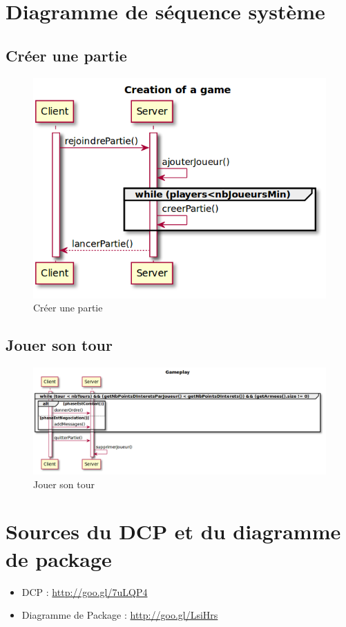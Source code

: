 \section{Diagramme de séquence système}
	\subsection{Créer une partie}
		\vspace{10mm}
		\begin{figure}[!h]
			\centering
			\includegraphics[scale=0.5]{images/DSSCreate.png}
			\caption{Créer une partie}
		\end{figure}


	\subsection{Jouer son tour}
		\vspace{10mm}
		\begin{figure}[!h]
			\centering
			\includegraphics[scale=0.3]{images/DSSGameplay.png}
			\caption{Jouer son tour}
		\end{figure}
		\vspace{70mm}

\section{Sources du DCP et du diagramme de package}
	\begin{itemize}
		\item DCP : \url{http://goo.gl/7uLQP4}
		\item Diagramme de Package : \url{http://goo.gl/LsiHrs}
	\end{itemize}
